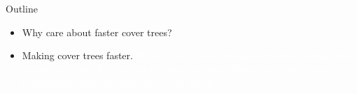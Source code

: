 \documentclass{beamer}
\author {Izbicki and Shelton}
\institute{UC Riverside}
\title[Faster Cover Trees]{}
\theoremstyle{nameddefinition}
\newcommand\+{\op}
\begin{document}
 \beamertemplatenavigationsymbolsempty




\newcommand{\spacer}[1]{
    \begin{frame}
    \begin{center}
    \Huge\em{#1}
    \end{center}
    \end{frame}
}

\begin{frame}[fragile]

\centering

%
%
%


\end{frame}


\begin{frame}[fragile]{Outline}
\LARGE
\centering
\begin{itemize}
\item
Why care about faster cover trees?
\vspace{0.2in}
\item
Making cover trees faster.
\textcolor{white}{
\Large
\vspace{0.15in}
Experimental setup
\vspace{0.15in}
Simpler definition reduces the number of nodes
\vspace{0.15in}
The nearest ancestor invariant
\vspace{0.15in}
Better cache performance
\vspace{0.15in}
Constructing and querying the tree in parallel
}
\end{itemize}
\end{frame}
\end{document}
